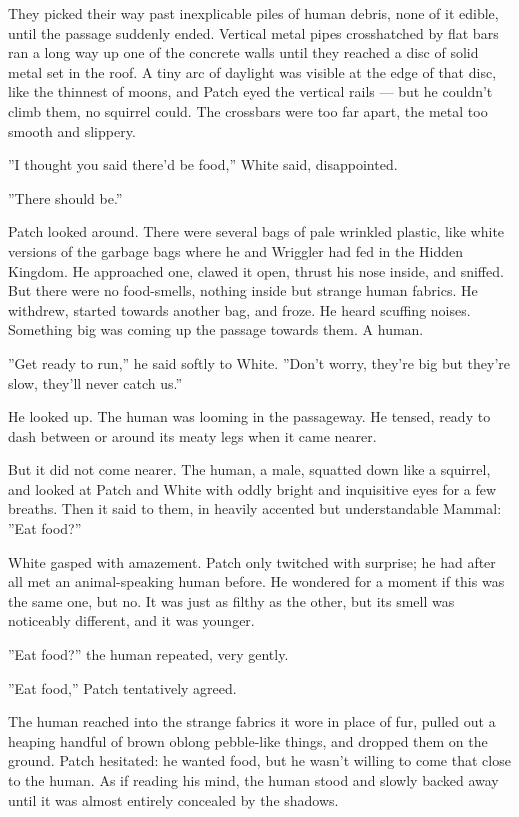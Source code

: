 \documentclass[12pt]{book}
\begin{document}
They picked their way past inexplicable piles of human debris, none of
it edible, until the passage suddenly ended. Vertical metal pipes
crosshatched by flat bars ran a long way up one of the concrete walls
until they reached a disc of solid metal set in the roof. A tiny arc
of daylight was visible at the edge of that disc, like the thinnest of
moons, and Patch eyed the vertical rails --- but he couldn't climb
them, no squirrel could. The crossbars were too far apart, the metal
too smooth and slippery.

''I thought you said there'd be food,'' White said, disappointed.

''There should be.''

Patch looked around. There were several bags of pale wrinkled plastic,
like white versions of the garbage bags where he and Wriggler had fed
in the Hidden Kingdom. He approached one, clawed it open, thrust his
nose inside, and sniffed. But there were no food-smells, nothing
inside but strange human fabrics. He withdrew, started towards another
bag, and froze. He heard scuffing noises. Something big was coming up
the passage towards them. A human.

''Get ready to run,'' he said softly to White. ''Don't worry, they're
big but they're slow, they'll never catch us.''

He looked up. The human was looming in the passageway. He tensed,
ready to dash between or around its meaty legs when it came nearer.

But it did not come nearer. The human, a male, squatted down like a
squirrel, and looked at Patch and White with oddly bright and
inquisitive eyes for a few breaths. Then it said to them, in heavily
accented but understandable Mammal: ''Eat food?''

White gasped with amazement. Patch only twitched with surprise; he had
after all met an animal-speaking human before. He wondered for a
moment if this was the same one, but no. It was just as filthy as the
other, but its smell was noticeably different, and it was younger.

''Eat food?'' the human repeated, very gently.

''Eat food,'' Patch tentatively agreed.

The human reached into the strange fabrics it wore in place of fur,
pulled out a heaping handful of brown oblong pebble-like things, and
dropped them on the ground. Patch hesitated: he wanted food, but he
wasn't willing to come that close to the human. As if reading his
mind, the human stood and slowly backed away until it was almost
entirely concealed by the shadows.
\end{document}
